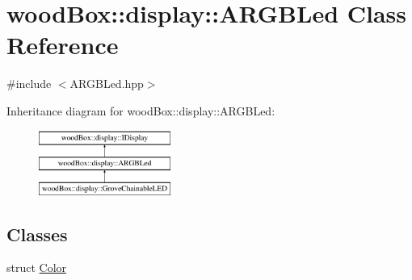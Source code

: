 \hypertarget{classwood_box_1_1display_1_1_a_r_g_b_led}{}\section{wood\+Box\+:\+:display\+:\+:A\+R\+G\+B\+Led Class Reference}
\label{classwood_box_1_1display_1_1_a_r_g_b_led}


{\ttfamily \#include $<$A\+R\+G\+B\+Led.\+hpp$>$}

Inheritance diagram for wood\+Box\+:\+:display\+:\+:A\+R\+G\+B\+Led\+:\begin{figure}[H]
\begin{center}
\leavevmode
\includegraphics[height=2.121212cm]{classwood_box_1_1display_1_1_a_r_g_b_led}
\end{center}
\end{figure}
\subsection*{Classes}
\begin{DoxyCompactItemize}
\item 
struct \mbox{\hyperlink{structwood_box_1_1display_1_1_a_r_g_b_led_1_1_color}{Color}}
\end{DoxyCompactItemize}
